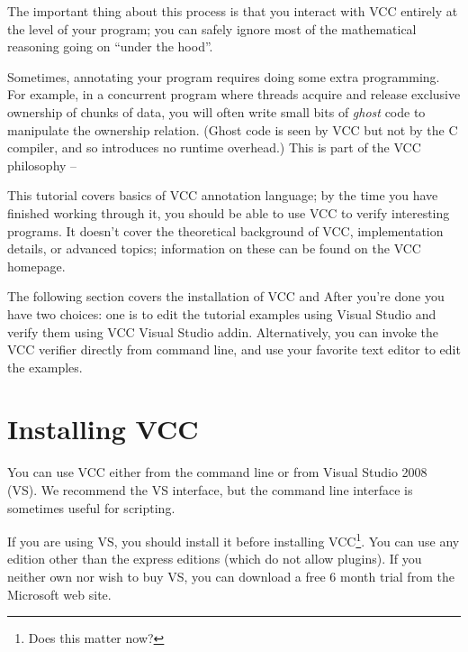 The important thing about this process is that you interact with VCC
entirely at the level of your program; you can safely ignore most of
the mathematical reasoning going on ``under the hood''.

Sometimes, annotating your program requires doing some extra
programming. For example, in a concurrent program where threads
acquire and release exclusive ownership of chunks of data, you will
often write small bits of \emph{ghost} code to manipulate the
ownership relation. (Ghost code is seen by VCC but not by the C
compiler, and so introduces no runtime overhead.) This is part of the
VCC philosophy -- 

This tutorial covers basics of VCC annotation language; by the time
you have finished working through it, you should be able to use VCC to
verify interesting programs. It doesn't cover the theoretical
background of VCC, implementation details, or advanced topics;
information on these can be found on the VCC homepage.


The following section covers the installation of VCC and 
After you're done you have two choices: one is to edit the tutorial examples
using Visual Studio and verify them using VCC Visual Studio addin.
Alternatively, you can invoke the VCC verifier directly from command line,
and use your favorite text editor to edit the examples.

\section{Installing VCC} 
You can use VCC either from the command line or from Visual Studio
2008 (VS).  We recommend the VS interface, but the command line interface
is sometimes useful for scripting.

If you are using VS, you should install it before
installing VCC\footnote{Does this matter now?}. You can use any
edition other than the express editions (which do not allow
plugins). If you neither own nor wish to buy VS, you can download a
free 6 month trial from the Microsoft web site.

